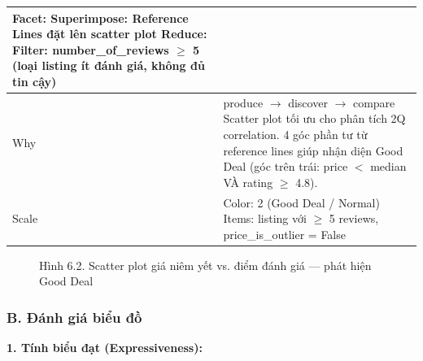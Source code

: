 \begin{longtable}{|p{2.8cm}|p{11.5cm}|}
\newline
\textbf{Facet:} \newline
\newline
Superimpose: Reference Lines đặt lên scatter plot \newline
\newline
\textbf{Reduce:} \newline
\newline
Filter: number\_of\_reviews $\geq$ 5 (loại listing ít đánh giá, không đủ tin cậy) \\
\hline
Why & produce $\rightarrow$ discover $\rightarrow$ compare \newline
Scatter plot tối ưu cho phân tích 2Q correlation. 4 góc phần tư từ reference lines giúp nhận diện Good Deal (góc trên trái: price $<$ median VÀ rating $\geq$ 4.8). \\
\hline
Scale & Color: 2 (Good Deal / Normal) \newline
Items: listing với $\geq$ 5 reviews, price\_is\_outlier = False \\
\hline
\end{longtable}

\begin{figure}[H]
    \centering
    \caption{Hình 6.2. Scatter plot giá niêm yết vs. điểm đánh giá --- phát hiện Good Deal}
    \label{fig:domain-task6-chart2}
\end{figure}

\subsubsection*{B. Đánh giá biểu đồ}

\textbf{1. Tính biểu đạt (Expressiveness):}

